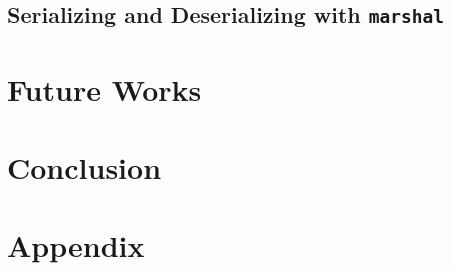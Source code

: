 \documentclass[acmlarge]{acmart}
\begin{document}
\subsection{Serializing and Deserializing with \texttt{marshal}}

\section{Future Works}

\section{Conclusion}

\section{Appendix}



\end{document}
